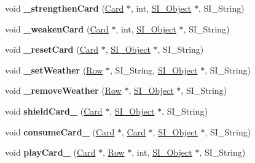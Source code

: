\begin{DoxyCompactItemize}
\mbox{\label{class_field_a643a62cbf2e6976cd7c2491fb381e2e6}} 
void {\bfseries \+\_\+strengthen\+Card} (\hyperlink{class_card}{Card} $\ast$, int, \hyperlink{class_s_i___object}{S\+I\+\_\+\+Object} $\ast$, S\+I\+\_\+\+String)
\item 
\mbox{\label{class_field_ab617d82c4f6bff280c4167a7b92d9086}} 
void {\bfseries \+\_\+weaken\+Card} (\hyperlink{class_card}{Card} $\ast$, int, \hyperlink{class_s_i___object}{S\+I\+\_\+\+Object} $\ast$, S\+I\+\_\+\+String)
\item 
\mbox{\label{class_field_a3477ee3089ec974ebe113eeac70f072f}} 
void {\bfseries \+\_\+reset\+Card} (\hyperlink{class_card}{Card} $\ast$, \hyperlink{class_s_i___object}{S\+I\+\_\+\+Object} $\ast$, S\+I\+\_\+\+String)
\item 
\mbox{\label{class_field_ab5c8b6dd6677c9429b169ef6a587ffde}} 
void {\bfseries \+\_\+set\+Weather} (\hyperlink{class_card_set}{Row} $\ast$, S\+I\+\_\+\+String, \hyperlink{class_s_i___object}{S\+I\+\_\+\+Object} $\ast$, S\+I\+\_\+\+String)
\item 
\mbox{\label{class_field_a5edf42124c15d414c713dce172e171fe}} 
void {\bfseries \+\_\+remove\+Weather} (\hyperlink{class_card_set}{Row} $\ast$, \hyperlink{class_s_i___object}{S\+I\+\_\+\+Object} $\ast$, S\+I\+\_\+\+String)
\item 
\mbox{\label{class_field_ae8eb2c6fcaf49881dfd88a1f8acc4c1a}} 
void {\bfseries shield\+Card\+\_\+} (\hyperlink{class_card}{Card} $\ast$, \hyperlink{class_s_i___object}{S\+I\+\_\+\+Object} $\ast$, S\+I\+\_\+\+String)
\item 
\mbox{\label{class_field_af2b18af1d67f7f37ce6b59fa49395368}} 
void {\bfseries consume\+Card\+\_\+} (\hyperlink{class_card}{Card} $\ast$, \hyperlink{class_card}{Card} $\ast$, \hyperlink{class_s_i___object}{S\+I\+\_\+\+Object} $\ast$, S\+I\+\_\+\+String)
\item 
\mbox{\label{class_field_a3517ba57b0ae917d937674eb9214e8ae}} 
void {\bfseries play\+Card\+\_\+} (\hyperlink{class_card}{Card} $\ast$, \hyperlink{class_card_set}{Row} $\ast$, int, \hyperlink{class_s_i___object}{S\+I\+\_\+\+Object} $\ast$, S\+I\+\_\+\+String)

\end{DoxyCompactItemize}
